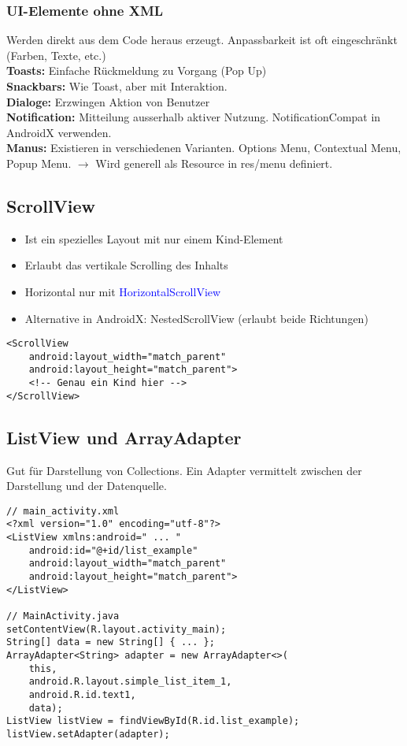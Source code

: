 \subsubsection{UI-Elemente ohne XML}
Werden direkt aus dem Code heraus erzeugt. Anpassbarkeit ist oft eingeschränkt (Farben, Texte, etc.)\\
\textbf{Toasts:} Einfache Rückmeldung zu Vorgang (Pop Up)\\
\textbf{Snackbars:} Wie Toast, aber mit Interaktion.\\
\textbf{Dialoge:} Erzwingen Aktion von Benutzer\\
\textbf{Notification:} Mitteilung ausserhalb aktiver Nutzung. NotificationCompat in AndroidX verwenden.\\
\textbf{Manus:} Existieren in verschiedenen Varianten. Options Menu, Contextual Menu, Popup Menu. $\rightarrow$ Wird generell als Resource in res/menu definiert.
\subsection{ScrollView}
\begin{itemize}[topsep=0pt, leftmargin=4mm]
    \setlength\itemsep{-0.3em}
    \item Ist ein spezielles Layout mit nur einem Kind-Element
    \item Erlaubt das vertikale Scrolling des Inhalts
    \item Horizontal nur mit \textcolor{blue}{HorizontalScrollView}
    \item Alternative in AndroidX: NestedScrollView (erlaubt beide Richtungen)
\end{itemize}
\begin{lstlisting}
<ScrollView
    android:layout_width="match_parent"
    android:layout_height="match_parent">
    <!-- Genau ein Kind hier -->
</ScrollView>
\end{lstlisting}
\subsection{ListView und ArrayAdapter}
Gut für Darstellung von Collections. Ein Adapter vermittelt zwischen der Darstellung und der Datenquelle.
\begin{lstlisting}
// main_activity.xml
<?xml version="1.0" encoding="utf-8"?>
<ListView xmlns:android=" ... "
    android:id="@+id/list_example"
    android:layout_width="match_parent"
    android:layout_height="match_parent">
</ListView>

// MainActivity.java
setContentView(R.layout.activity_main);
String[] data = new String[] { ... };
ArrayAdapter<String> adapter = new ArrayAdapter<>(
    this,
    android.R.layout.simple_list_item_1,
    android.R.id.text1,
    data);
ListView listView = findViewById(R.id.list_example);
listView.setAdapter(adapter);
\end{lstlisting}
